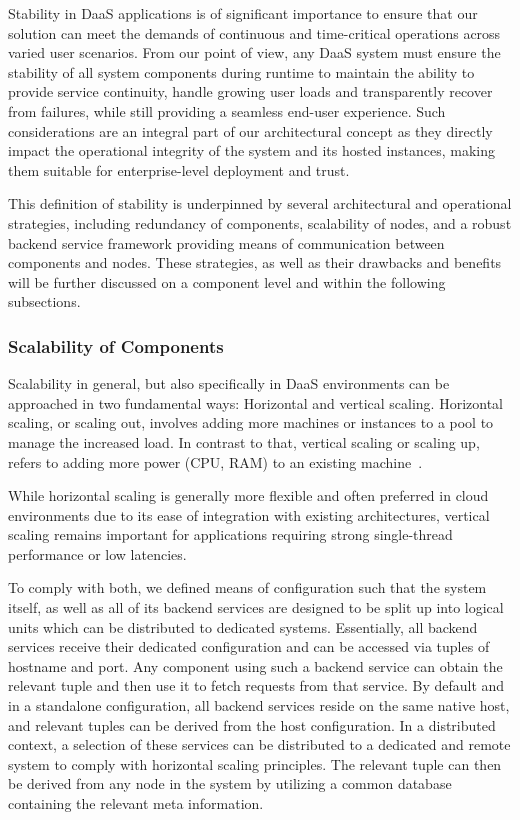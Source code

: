 \documentclass[runningheads]{llncs}
\begin{document}
Stability in DaaS applications is of significant importance
to ensure that our solution can meet the demands of continuous
and time-critical operations across varied user scenarios.
From our point of view, any DaaS system must ensure the stability
of all system components during runtime
to maintain the ability to provide service continuity,
handle growing user loads and transparently recover from failures,
while still providing a seamless end-user experience.
Such considerations are an integral part of our architectural concept
as they directly impact the operational integrity
of the system and its hosted instances,
making them suitable for enterprise-level deployment and trust.

This definition of stability is underpinned by several architectural
and operational strategies, including redundancy of components, scalability of nodes,
and a robust backend service framework
providing means of communication between components and nodes.
These strategies, as well as their drawbacks and benefits
will be further discussed on a component level
and within the following subsections.

\subsubsection{Scalability of Components}

Scalability in general, but also specifically in DaaS environments
can be approached in two fundamental ways:
Horizontal and vertical scaling.
Horizontal scaling, or scaling out, involves adding more machines or instances
to a pool to manage the increased load.
In contrast to that, vertical scaling or scaling up,
refers to adding more power (CPU, RAM)
to an existing machine~\cite{vaquero2011dynamically}.

While horizontal scaling is generally more flexible
and often preferred in cloud environments
due to its ease of integration with existing architectures,
vertical scaling remains important for applications
requiring strong single-thread performance or low latencies.

To comply with both, we defined means of configuration
such that the system itself, as well as all of its backend services
are designed to be split up into logical units
which can be distributed to dedicated systems.
Essentially, all backend services receive their dedicated configuration
and can be accessed via tuples of hostname and port.
Any component using such a backend service can obtain the relevant tuple
and then use it to fetch requests from that service.
By default and in a standalone configuration,
all backend services reside on the same native host, and relevant tuples can be derived from the host configuration.
In a distributed context, a selection of these services
can be distributed to a dedicated and remote system
to comply with horizontal scaling principles.
The relevant tuple can then be derived from any node in the system
by utilizing a common database containing the relevant meta information.
\end{document}
